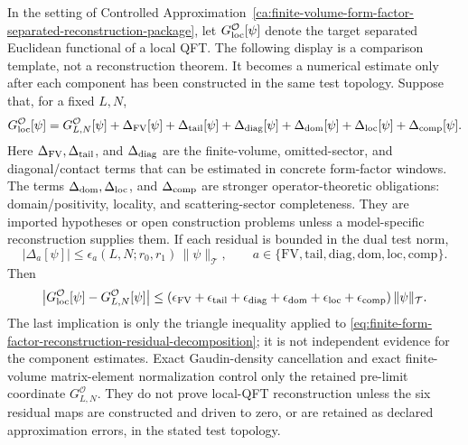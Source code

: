 \begin{remark}
\label{rem:finite-form-factor-reconstruction-proof-obligation-map}
In the setting of
Controlled Approximation~\ref{ca:finite-volume-form-factor-separated-reconstruction-package},
let \(G_{\rm loc}^{\mathcal O}[\psi]\) denote the target separated Euclidean
functional of a local QFT.  The following display is a comparison template,
not a reconstruction theorem.  It becomes a numerical estimate only after each
component has been constructed in the same test topology.  Suppose that, for a
fixed \(L,N\),
\begin{equation}
  G_{\rm loc}^{\mathcal O}[\psi]
  =
  G_{L,N}^{\mathcal O}[\psi]
  +\Delta_{\rm FV}[\psi]
  +\Delta_{\rm tail}[\psi]
  +\Delta_{\rm diag}[\psi]
  +\Delta_{\rm dom}[\psi]
  +\Delta_{\rm loc}[\psi]
  +\Delta_{\rm comp}[\psi].
  \label{eq:finite-form-factor-reconstruction-residual-decomposition}
\end{equation}
Here \(\Delta_{\rm FV},\Delta_{\rm tail}\), and \(\Delta_{\rm diag}\) are the
finite-volume, omitted-sector, and diagonal/contact terms that can be
estimated in concrete form-factor windows.  The terms
\(\Delta_{\rm dom},\Delta_{\rm loc}\), and \(\Delta_{\rm comp}\) are stronger
operator-theoretic obligations: domain/positivity, locality, and
scattering-sector completeness.  They are imported hypotheses or open
construction problems unless a model-specific reconstruction supplies them.
If each residual is bounded in the dual test norm,
\begin{equation}
  |\Delta_a[\psi]|
  \le
  \epsilon_a(L,N;r_0,r_1)\,\|\psi\|_{\mathcal T},
  \qquad
  a\in\{\mathrm{FV},\mathrm{tail},\mathrm{diag},
  \mathrm{dom},\mathrm{loc},\mathrm{comp}\}.
  \label{eq:finite-form-factor-reconstruction-component-bounds}
\end{equation}
Then
\begin{equation}
  \left|
  G_{\rm loc}^{\mathcal O}[\psi]-G_{L,N}^{\mathcal O}[\psi]
  \right|
  \le
  \left(
  \epsilon_{\rm FV}
  +\epsilon_{\rm tail}
  +\epsilon_{\rm diag}
  +\epsilon_{\rm dom}
  +\epsilon_{\rm loc}
  +\epsilon_{\rm comp}
  \right)\|\psi\|_{\mathcal T}.
  \label{eq:finite-form-factor-reconstruction-budget-bound}
\end{equation}
The last implication is only the triangle inequality applied to
\eqref{eq:finite-form-factor-reconstruction-residual-decomposition}; it is not
independent evidence for the component estimates.  Exact Gaudin-density
cancellation and exact finite-volume matrix-element normalization control only
the retained pre-limit coordinate \(G_{L,N}^{\mathcal O}\).  They do not prove
local-QFT reconstruction unless the six residual maps are constructed and
driven to zero, or are retained as declared approximation errors, in the stated
test topology.
\end{remark}

